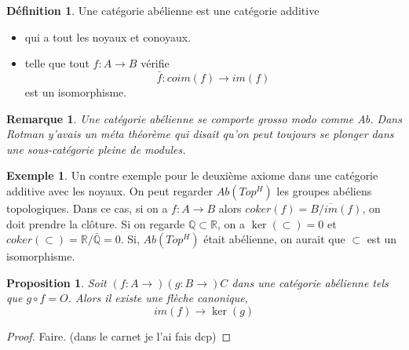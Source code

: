 \documentclass[a4paper,12pt]{book}
\newcommand{\R}{\mathbb{R}}
\newcommand{\Q}{\mathbb{Q}}
\theoremstyle{plain}
\newtheorem{prop}[subsection]{Proposition}
\newtheorem{rem}{Remarque}
\theoremstyle{definition}
\newtheorem{defn}[subsection]{Définition}
\newtheorem{ex}[subsection]{Exemple}
\theoremstyle{remark}
\begin{document}
\begin{defn}
    Une catégorie abélienne est une catégorie additive 
    \begin{itemize}
	\item qui a tout les noyaux et conoyaux. 
	\item telle que tout $f\colon A\to B$ vérifie 
	    \[\bar f\colon coim(f)\to im(f)\]
	    est un isomorphisme.
    \end{itemize}
\end{defn}
\begin{rem}
    Une catégorie abélienne se comporte grosso modo comme Ab. Dans
    Rotman y'avais un méta théorème qui disait qu'on peut toujours
    se plonger dans une sous-catégorie pleine de modules.
\end{rem}

\begin{ex}
    Un contre exemple pour le deuxième axiome dans une catégorie
    additive avec les noyaux. On peut regarder $Ab(Top^H)$ les
    groupes abéliens topologiques. Dans ce cas, si on a $f\colon A\to B$
    alors $coker(f)=B/\overline{im}(f)$, on doit prendre la clôture.
    Si on regarde $\Q\subset \R$, on a $\ker(\subset)=0$ et 
    $coker(\subset)=\R/\bar{\Q}=0$. Si, $Ab(Top^H)$ était abélienne,
    on aurait que $\subset$ est un isomorphisme.
\end{ex}
\begin{prop}
    Soit $(f\colon A\to)(g\colon B\to) C$ dans une catégorie abélienne
    tels que $g\circ f=O$. Alors il existe une flèche canonique,
    \[im(f)\to \ker(g)\]
\end{prop}
\begin{proof}
    Faire. (dans le carnet je l'ai fais dcp)
\end{proof}
\end{document}
